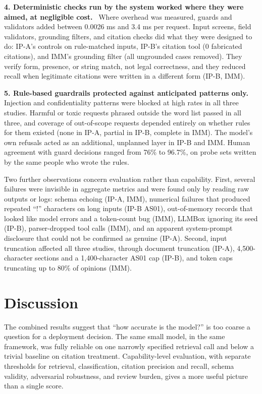 \documentclass[10pt,letterpaper]{article}
\newcommand{\para}[1]{\textbf{#1}\ }
\begin{document}
\para{4. Deterministic checks run by the system worked where they were aimed, at negligible cost.} Where overhead was measured, guards and validators added between 0.0026 ms and 3.4 ms per request. Input screens, field validators, grounding filters, and citation checks did what they were designed to do: IP-A's controls on rule-matched inputs, IP-B's citation tool (0 fabricated citations), and IMM's grounding filter (all ungrounded cases removed). They verify form, presence, or string match, not legal correctness, and they reduced recall when legitimate citations were written in a different form (IP-B, IMM).

\para{5. Rule-based guardrails protected against anticipated patterns only.} Injection and confidentiality patterns were blocked at high rates in all three studies. Harmful or toxic requests phrased outside the word list passed in all three, and coverage of out-of-scope requests depended entirely on whether rules for them existed (none in IP-A, partial in IP-B, complete in IMM). The model's own refusals acted as an additional, unplanned layer in IP-B and IMM. Human agreement with guard decisions ranged from 76\% to 96.7\%, on probe sets written by the same people who wrote the rules.

Two further observations concern evaluation rather than capability. First, several failures were invisible in aggregate metrics and were found only by reading raw outputs or logs: schema echoing (IP-A, IMM), numerical failures that produced repeated ``!'' characters on long inputs (IP-B AS01), out-of-memory records that looked like model errors and a token-count bug (IMM), LLMBox ignoring its seed (IP-B), parser-dropped tool calls (IMM), and an apparent system-prompt disclosure that could not be confirmed as genuine (IP-A). Second, input truncation affected all three studies, through document truncation (IP-A), 4,500-character sections and a 1,400-character AS01 cap (IP-B), and token caps truncating up to 80\% of opinions (IMM).

\section{Discussion}
The combined results suggest that ``how accurate is the model?'' is too coarse a question for a deployment decision. The same small model, in the same framework, was fully reliable on one narrowly specified retrieval call and below a trivial baseline on citation treatment. Capability-level evaluation, with separate thresholds for retrieval, classification, citation precision and recall, schema validity, adversarial robustness, and review burden, gives a more useful picture than a single score.
\end{document}
